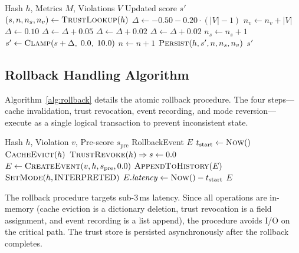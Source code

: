 \documentclass[conference]{IEEEtran}
\begin{document}
\begin{algorithm}[t]
\caption{Trust Update.}
\label{alg:trust}
\begin{algorithmic}[1]
\Require Hash $h$, Metrics $M$, Violations $V$
\Ensure Updated score $s'$
\State $(s, n, n_s, n_v) \gets \textsc{TrustLookup}(h)$
 
  \State $\Delta \gets -0.50 - 0.20 \cdot (|V| - 1)$
  \State $n_v \gets n_v + |V|$
\Else {}
  \State $\Delta \gets 0.10$ 
    \State $\Delta \gets \Delta + 0.05$
  \EndIf
    \State $\Delta \gets \Delta + 0.02$
  \EndIf
    \State $\Delta \gets \Delta + 0.02$
  \EndIf
  \State $n_s \gets n_s + 1$
\EndIf
\State $s' \gets \textsc{Clamp}(s + \Delta,\; 0.0,\; 10.0)$
\State $n \gets n + 1$
\State $\textsc{Persist}(h, s', n, n_s, n_v)$
\State \Return $s'$
\end{algorithmic}
\end{algorithm}

\subsection{Rollback Handling Algorithm}

Algorithm~\ref{alg:rollback} details the atomic rollback
procedure. The four steps---cache invalidation, trust
revocation, event recording, and mode reversion---execute
as a single logical transaction to prevent inconsistent state.

\begin{algorithm}[t]
\caption{Rollback Handler.}
\label{alg:rollback}
\begin{algorithmic}[1]
\Require Hash $h$, Violation $v$, Pre-score $s_{\text{pre}}$
\Ensure RollbackEvent $E$
\State $t_{\text{start}} \gets \textsc{Now}()$
\State $\textsc{CacheEvict}(h)$ 
\State $\textsc{TrustRevoke}(h) \Rightarrow s \gets 0.0$ 
\State $E \gets \textsc{CreateEvent}(v, h, s_{\text{pre}}, 0.0)$
\State $\textsc{AppendToHistory}(E)$ 
\State $\textsc{SetMode}(h, \text{INTERPRETED})$ 
\State $E.\mathit{latency} \gets \textsc{Now}() - t_{\text{start}}$
\State \Return $E$
\end{algorithmic}
\end{algorithm}

The rollback procedure targets sub-3\,ms latency. Since all
operations are in-memory (cache eviction is a dictionary deletion,
trust revocation is a field assignment, and event recording is
a list append), the procedure avoids I/O on the critical path.
The trust store is persisted asynchronously after the rollback
completes.
\end{document}
